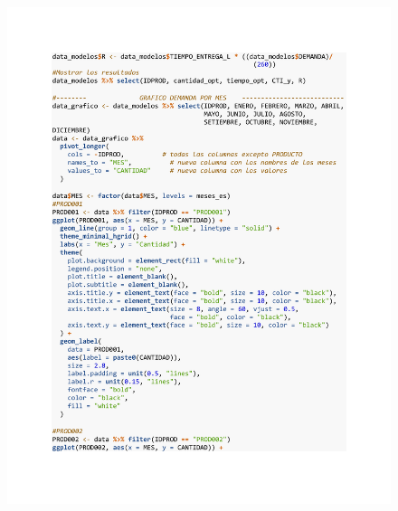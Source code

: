 \begin{figure}[h!]
        \begin{tcolorbox}[colback=white, colframe=black, boxrule=1.5pt, sharp corners=all]
            {\includegraphics[width=\linewidth, height=22cm, trim=2.5cm 2.75cm 2.5cm 2.5cm, clip]{images/script6.pdf}}
        \end{tcolorbox}
\end{figure}

